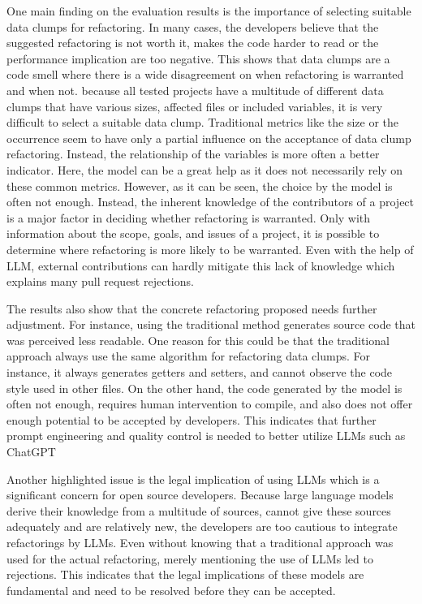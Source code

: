 One main finding on the evaluation results is the importance of selecting suitable data clumps for refactoring. In many cases, the developers believe that the suggested refactoring is not worth it, makes the code harder to read or the performance implication are too negative. This shows that data clumps are a code smell where there is a wide disagreement on when refactoring is warranted and when not. because all tested projects have a multitude of different data clumps that have various sizes, affected files or included variables, it is very difficult to select a suitable data clump. Traditional metrics like the size or the occurrence seem to have only a partial influence on the acceptance of data clump refactoring. Instead, the relationship of the variables is more often a better indicator. Here, the model can be a great help as it does not necessarily rely on these common metrics. However, as it can be seen, the choice by the model is often not enough. Instead, the inherent knowledge of the contributors of a project is a major factor in  deciding whether refactoring is warranted. Only with information about the scope, goals, and issues of a project, it is possible to determine where refactoring is more likely to be warranted. Even with the help of \ac{LLM}, external contributions can hardly mitigate this lack of knowledge which explains many pull request rejections. 

The results also show that the concrete refactoring proposed needs further adjustment. For instance, using the traditional method generates source code that was perceived less readable. One reason for this could be that the traditional approach always use the same algorithm for refactoring data clumps. For instance, it always generates getters and setters, and cannot observe the code style used in other files. On the other hand, the code generated by the model is often not enough, requires human intervention to compile, and also does not offer enough potential to be accepted by developers. This indicates that further prompt engineering and quality control is needed to better utilize \acp{LLM} such as ChatGPT

Another highlighted issue is the legal implication of using \acp{LLM} which is a significant concern for open source developers. Because large language models derive their knowledge from a multitude of sources, cannot give these sources adequately and are relatively new, the developers are too cautious to integrate refactorings by \acp{LLM}. Even without knowing that a traditional approach was used for the actual refactoring, merely mentioning the use of LLMs led to rejections.  This indicates that the legal implications of these models are fundamental and need to be resolved before they can be accepted. 

